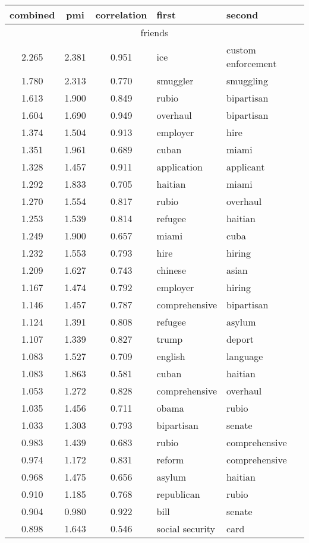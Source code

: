 \begin{tabular}{cccp{5cm}p{5cm}}
\toprule
combined & pmi & correlation & first & second\\
\midrule
\multicolumn{5}{c}{friends}\\
2.265 & 2.381 & 0.951 & ice & custom enforcement \\
1.780 & 2.313 & 0.770 & smuggler & smuggling \\
1.613 & 1.900 & 0.849 & rubio & bipartisan \\
1.604 & 1.690 & 0.949 & overhaul & bipartisan \\
1.374 & 1.504 & 0.913 & employer & hire \\
1.351 & 1.961 & 0.689 & cuban & miami \\
1.328 & 1.457 & 0.911 & application & applicant \\
1.292 & 1.833 & 0.705 & haitian & miami \\
1.270 & 1.554 & 0.817 & rubio & overhaul \\
1.253 & 1.539 & 0.814 & refugee & haitian \\
1.249 & 1.900 & 0.657 & miami & cuba \\
1.232 & 1.553 & 0.793 & hire & hiring \\
1.209 & 1.627 & 0.743 & chinese & asian \\
1.167 & 1.474 & 0.792 & employer & hiring \\
1.146 & 1.457 & 0.787 & comprehensive & bipartisan \\
1.124 & 1.391 & 0.808 & refugee & asylum \\
1.107 & 1.339 & 0.827 & trump & deport \\
1.083 & 1.527 & 0.709 & english & language \\
1.083 & 1.863 & 0.581 & cuban & haitian \\
1.053 & 1.272 & 0.828 & comprehensive & overhaul \\
1.035 & 1.456 & 0.711 & obama & rubio \\
1.033 & 1.303 & 0.793 & bipartisan & senate \\
0.983 & 1.439 & 0.683 & rubio & comprehensive \\
0.974 & 1.172 & 0.831 & reform & comprehensive \\
0.968 & 1.475 & 0.656 & asylum & haitian \\
0.910 & 1.185 & 0.768 & republican & rubio \\
0.904 & 0.980 & 0.922 & bill & senate \\
0.898 & 1.643 & 0.546 & social security & card \\

\end{tabular}
